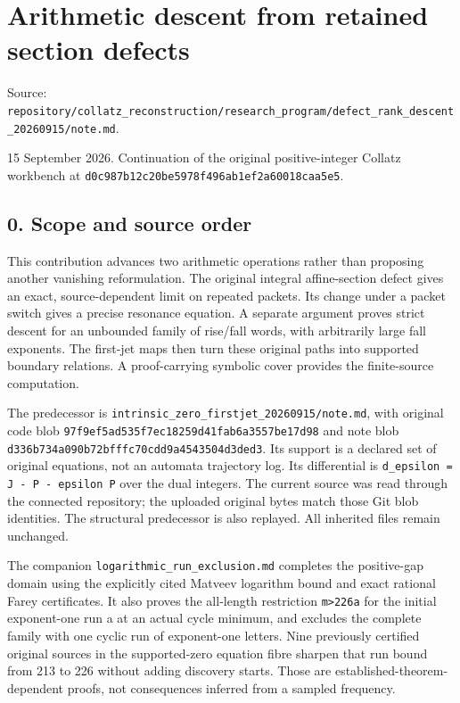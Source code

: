 \chapter{Arithmetic descent from retained section defects}
{\small\sffamily Source: \nolinkurl{repository/collatz_reconstruction/research_program/defect_rank_descent_20260915/note.md}.\par}


15 September 2026. Continuation of the original positive-integer Collatz
workbench at \nolinkurl{d0c987b12c20be5978f496ab1ef2a60018caa5e5}.

\section{0. Scope and source order}

This contribution advances two arithmetic operations rather than
proposing another vanishing reformulation. The original integral
affine-section defect gives an exact, source-dependent limit on repeated
packets. Its change under a packet switch gives a precise resonance
equation. A separate argument proves strict descent for an unbounded
family of rise/fall words, with arbitrarily large fall exponents. The
first-jet maps then turn these original paths into supported boundary
relations. A proof-carrying symbolic cover provides the finite-source
computation.

The predecessor is \nolinkurl{intrinsic_zero_firstjet_20260915/note.md},
with original code blob
\nolinkurl{97f9ef5ad535f7ec18259d41fab6a3557be17d98} and note blob
\nolinkurl{d336b734a090b72bfffc70cdd9a4543504d3ded3}. Its support is a
declared set of original equations, not an automata trajectory log. Its
differential is \nolinkurl{d_epsilon = J - P - epsilon P} over the dual
integers. The current source was read through the connected repository;
the uploaded original bytes match those Git blob identities. The
structural predecessor is also replayed. All inherited files remain
unchanged.

The companion \nolinkurl{logarithmic_run_exclusion.md} completes the
positive-gap domain using the explicitly cited Matveev logarithm bound
and exact rational Farey certificates. It also proves the all-length
restriction \nolinkurl{m>226a} for the initial exponent-one run a at an
actual cycle minimum, and excludes the complete family with one cyclic
run of exponent-one letters. Nine previously certified original sources
in the supported-zero equation fibre sharpen that run bound from 213 to
226 without adding discovery starts. Those are
established-theorem-dependent proofs, not consequences inferred from a
sampled frequency.

